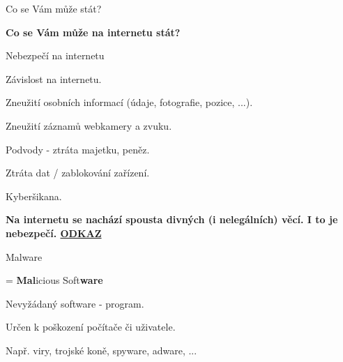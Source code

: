 \documentclass[aspectratio=169]{beamer}
\begin{document}
\begin{frame}{Co se Vám může stát?}
    \begin{cardTiny}
        \begin{center}
            \textbf{Co se Vám může na internetu stát?}
        \end{center}
    \end{cardTiny}
\end{frame}

\begin{frame}{Nebezpečí na internetu}
    \begin{cardTiny}
        \begin{flushleft}
            Závislost na internetu.

            Zneužití osobních informací (údaje, fotografie, pozice, ...).

            Zneužití záznamů webkamery a zvuku.

            Podvody - ztráta majetku, peněz.

            Ztráta dat / zablokování zařízení.
        
            Kyberšikana.
        \end{flushleft}
    \end{cardTiny}
    \begin{cardTiny}
        \begin{flushleft}
            \textbf{Na internetu se nachází spousta divných (i nelegálních) věcí. I to je nebezpečí. \href{https://www.youtube.com/watch?v=dQw4w9WgXcQ}{ODKAZ}}
        \end{flushleft}
    \end{cardTiny}
\end{frame}

\begin{frame}{Malware}
    \begin{cardTiny}
        \begin{flushleft}
            = \textbf{Mal}icious Soft\textbf{ware}

            \vspace{2ex}
            Nevyžádaný software - program.

            Určen k poškození počítače či uživatele.

            \vspace{2ex}        
            Např. viry, trojské koně, spyware, adware, ...
        \end{flushleft}
    \end{cardTiny}
\end{frame}
\end{document}
